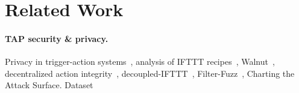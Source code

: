 \section{Related Work}
\label{sec:related}

\paragraph{TAP security \& privacy.}
Privacy in trigger-action systems~\cite{DBLP:conf/sp/ChenCWSCF21}, analysis of
IFTTT
recipes~\cite{DBLP:conf/chi/UrHBLMPSL16,DBLP:conf/www/SurbatovichABDJ17, DBLP:conf/imc/MiQZW17},
Walnut~\cite{DBLP:journals/corr/abs-2009-12447}, decentralized action
integrity~\cite{DBLP:conf/ndss/FernandesRJP18},
decoupled-IFTTT~\cite{DBLP:journals/corr/FernandesRJP17},
Filter-Fuzz~\cite{DBLP:journals/access/XuZZCDG19},
Charting the Attack Surface. \cite{DBLP:conf/ccs/WangDYL0G19}
Dataset~\cite{DBLP:journals/corr/abs-2110-00068}
